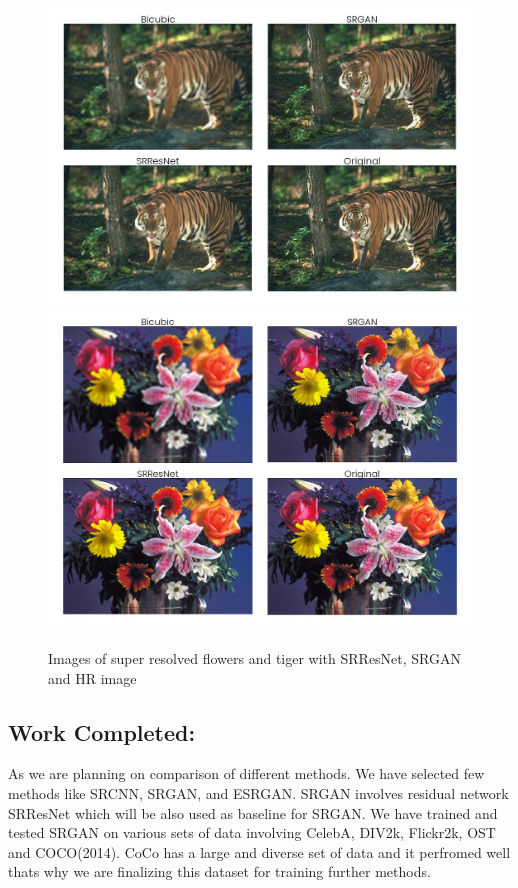     \begin{figure}
        \centering
        \includegraphics[width=5.5in]{./figures/examples/tiger.jpg}
        \includegraphics[width=5.5in]{./figures/examples/flowers.jpg}
        \caption{Images of super resolved flowers and tiger with SRResNet, SRGAN and HR image}
    \end{figure}      
  
\clearpage
\newpage
\subsection{Work Completed:}
As we are planning on comparison of different methods. We have selected few methods like SRCNN, SRGAN, and ESRGAN. SRGAN involves residual network SRResNet which will be also used as baseline for SRGAN. We have trained and tested SRGAN on various sets of data involving CelebA, DIV2k, Flickr2k, OST and COCO(2014). CoCo has a large and diverse set of data and it perfromed well thats why we are finalizing this dataset for training further methods. 

